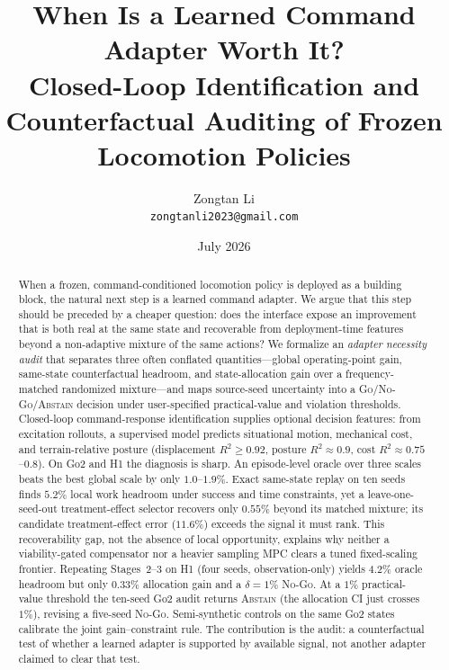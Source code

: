 \documentclass{article}
\title{When Is a Learned Command Adapter Worth It?\\
Closed-Loop Identification and Counterfactual Auditing of Frozen Locomotion Policies}
\author{
  Zongtan Li \\
  \texttt{zongtanli2023@gmail.com} \\
}
\date{July 2026}
\begin{document}
\maketitle

\begin{abstract}
When a frozen, command-conditioned locomotion policy is deployed as a building
block, the natural next step is a learned command adapter. We argue that this
step should be preceded by a cheaper question: does the interface expose an
improvement that is both real at the same state and recoverable from
deployment-time features beyond a non-adaptive mixture of the same actions?
We formalize an \emph{adapter necessity audit} that separates three often
conflated quantities---global operating-point gain, same-state counterfactual
headroom, and state-allocation gain over a frequency-matched randomized
mixture---and maps source-seed uncertainty into a
\textsc{Go}/\textsc{No-Go}/\textsc{Abstain} decision under user-specified
practical-value and violation thresholds. Closed-loop command-response
identification supplies optional decision features: from excitation rollouts, a
supervised model predicts situational motion, mechanical cost, and
terrain-relative posture (displacement $R^2\ge0.92$, posture $R^2\approx0.9$,
cost $R^2\approx0.75$--$0.8$). On Go2 and H1 the diagnosis is sharp. An
episode-level oracle over three scales beats the best global scale by only
$1.0$--$1.9\%$. Exact same-state replay on ten seeds finds $5.2\%$ local work
headroom under success and time constraints, yet a leave-one-seed-out
treatment-effect selector recovers only $0.55\%$ beyond its matched mixture; its
candidate treatment-effect error ($11.6\%$) exceeds the signal it must rank.
This recoverability gap, not the absence of local opportunity, explains why
neither a viability-gated compensator nor a heavier sampling MPC clears a tuned
fixed-scaling frontier. Repeating Stages~2--3 on H1 (four seeds, observation-only)
yields $4.2\%$ oracle headroom but only $0.33\%$ allocation gain and a
$\delta=1\%$ \textsc{No-Go}. At a $1\%$ practical-value threshold the ten-seed
Go2 audit returns \textsc{Abstain} (the allocation CI just crosses $1\%$), revising a
five-seed \textsc{No-Go}. Semi-synthetic controls on the same Go2 states calibrate
the joint gain--constraint rule. The
contribution is the audit: a counterfactual test of whether a learned adapter
is supported by available signal, not another adapter claimed to clear that test.
\end{abstract}

\end{document}
